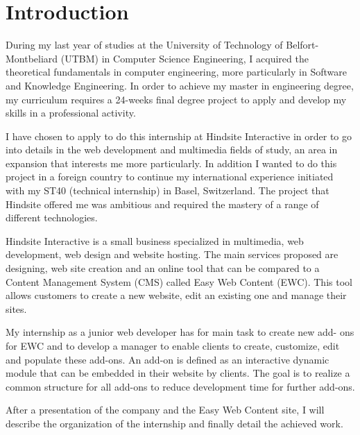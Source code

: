 \chapter*{Introduction}

During my last year of studies at the University of Technology of Belfort-
Montbeliard (UTBM) in Computer Science Engineering, I acquired the
theoretical fundamentals in computer engineering, more particularly in
Software and Knowledge Engineering. In order to achieve my master in
engineering degree, my curriculum requires a 24-weeks final degree project to
apply and develop my skills in a professional activity.

I have chosen to apply to do this internship at Hindsite Interactive in order to
go into details in the web development and multimedia fields of study, an area
in expansion that interests me more particularly. In addition I wanted to do this
project in a foreign country to continue my international experience initiated
with my ST40 (technical internship) in Basel, Switzerland. The project that
Hindsite offered me was ambitious and required the mastery of a range of
different technologies.

Hindsite Interactive is a small business specialized in multimedia, web
development, web design and website hosting. The main services proposed
are designing, web site creation and an online tool that can be compared to a
Content Management System (CMS) called Easy Web Content (EWC). This
tool allows customers to create a new website, edit an existing one and
manage their sites.

My internship as a junior web developer has for main task to create new add-
ons for EWC and to develop a manager to enable clients to create, customize,
edit and populate these add-ons. An add-on is defined as an interactive
dynamic module that can be embedded in their website by clients. The goal is
to realize a common structure for all add-ons to reduce development time for
further add-ons.

After a presentation of the company and the Easy Web Content site, I will
describe the organization of the internship and finally detail the achieved work.

\clearpage

